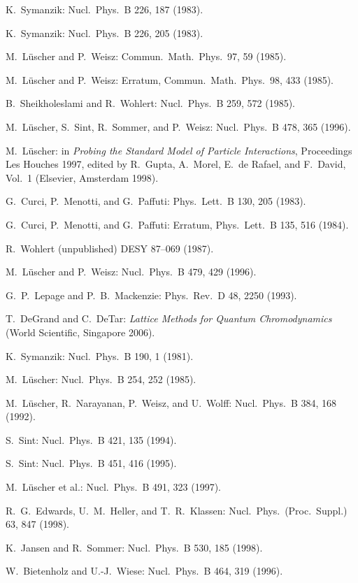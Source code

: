 \begin{enumerate}[label={[\arabic*]}]
  \item K.~Symanzik: Nucl.\ Phys.\ B 226, 187 (1983).
  \item K.~Symanzik: Nucl.\ Phys.\ B 226, 205 (1983).
  \item M.~L\"uscher and P.~Weisz: Commun.\ Math.\ Phys.\ 97, 59 (1985).
  \item M.~L\"uscher and P.~Weisz: Erratum, Commun.\ Math.\ Phys.\ 98, 433 (1985).
  \item B.~Sheikholeslami and R.~Wohlert: Nucl.\ Phys.\ B 259, 572 (1985).
  \item M.~L\"uscher, S.~Sint, R.~Sommer, and P.~Weisz: Nucl.\ Phys.\ B 478, 365 (1996).
  \item M.~L\"uscher: in \emph{Probing the Standard Model of Particle
        Interactions}, Proceedings Les Houches 1997, edited by R.~Gupta,
        A.~Morel, E.~de Rafael, and F.~David, Vol.~1 (Elsevier, Amsterdam
        1998).
  \item G.~Curci, P.~Menotti, and G.~Paffuti: Phys.\ Lett.\ B 130, 205 (1983).
  \item G.~Curci, P.~Menotti, and G.~Paffuti: Erratum, Phys.\ Lett.\ B 135, 516 (1984).
  \item R.~Wohlert (unpublished) DESY 87--069 (1987).
  \item M.~L\"uscher and P.~Weisz: Nucl.\ Phys.\ B 479, 429 (1996).
  \item G.~P.~Lepage and P.~B.~Mackenzie: Phys.\ Rev.\ D 48, 2250 (1993).
  \item T.~DeGrand and C.~DeTar: \emph{Lattice Methods for Quantum
        Chromodynamics} (World Scientific, Singapore 2006).
  \item K.~Symanzik: Nucl.\ Phys.\ B 190, 1 (1981).
  \item M.~L\"uscher: Nucl.\ Phys.\ B 254, 252 (1985).
  \item M.~L\"uscher, R.~Narayanan, P.~Weisz, and U.~Wolff: Nucl.\ Phys.\ B 384, 168 (1992).
  \item S.~Sint: Nucl.\ Phys.\ B 421, 135 (1994).
  \item S.~Sint: Nucl.\ Phys.\ B 451, 416 (1995).
  \item M.~L\"uscher et al.: Nucl.\ Phys.\ B 491, 323 (1997).
  \item R.~G.~Edwards, U.~M.~Heller, and T.~R.~Klassen: Nucl.\ Phys.\ (Proc.\ Suppl.) 63, 847 (1998).
  \item K.~Jansen and R.~Sommer: Nucl.\ Phys.\ B 530, 185 (1998).
  \item W.~Bietenholz and U.-J.~Wiese: Nucl.\ Phys.\ B 464, 319 (1996).

\end{enumerate}
